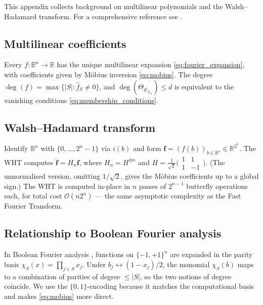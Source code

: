 \documentclass[12pt,a4paper]{article}
\theoremstyle{plain}
\theoremstyle{definition}
\theoremstyle{remark}
\newcommand{\R}{\mathbb{R}}
\newcommand{\chimon}[1]{\chi_{#1}}
\begin{document}
This appendix collects background on multilinear polynomials and the
Walsh--Hadamard transform.
For a comprehensive reference see \cite{O'Donnell2014}.

\subsection{Multilinear coefficients}

Every $f:\mathbb{B}^n\to\R$ has the unique multilinear expansion
\eqref{eq:fourier_expansion}, with coefficients given by Möbius
inversion \eqref{eq:mobius}.
The degree $\deg(f)=\max\{|S|:\hat{f}_S\neq 0\}$, and
$\deg(\Theta_{g|_{\mathcal{X}_n}})\leq d$ is equivalent to the vanishing conditions
\eqref{eq:membership_conditions}.

\subsection{Walsh--Hadamard transform}

Identify $\mathbb{B}^n$ with $\{0,\ldots,2^n-1\}$ via $i(b)$ and
form $\mathbf{f}=(f(b))_{b\in\mathbb{B}^n}\in\R^{2^n}$.
The WHT computes $\hat{\mathbf{f}}=H_n\mathbf{f}$, where
$H_n=H^{\otimes n}$ and
$H=\frac{1}{\sqrt{2}}\bigl(\begin{smallmatrix}1&1\\1&-1\end{smallmatrix}\bigr)$.
(The unnormalised version, omitting $1/\sqrt{2}$, gives the Möbius
coefficients up to a global sign.)
The WHT is computed in-place in $n$ passes of $2^{n-1}$ butterfly
operations each, for total cost $\mathcal{O}(n2^n)$ — the same
asymptotic complexity as the Fast Fourier Transform.

\subsection{Relationship to Boolean Fourier analysis}

In Boolean Fourier analysis \cite{O'Donnell2014}, functions on
$\{-1,+1\}^n$ are expanded in the parity basis $\chi_S(x)=\prod_{j\in S}x_j$.
Under $b_j\leftrightarrow(1-x_j)/2$, the monomial $\chimon{S}(b)$ maps
to a combination of parities of degree $\leq|S|$, so the two notions
of degree coincide.
We use the $\{0,1\}$-encoding because it matches the computational
basis and makes \eqref{eq:mobius} more direct.
\end{document}

